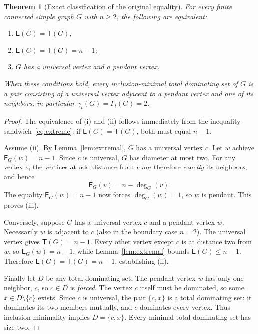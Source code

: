 \documentclass[11pt,a4paper]{article}
\newtheorem{theorem}{Theorem}[section]
\theoremstyle{definition}\newtheorem{definition}[theorem]{Definition}
\theoremstyle{remark}\newtheorem{remark}[theorem]{Remark}
\newcommand{\epar}{\mathsf E}
\newcommand{\trans}{\mathsf T}
\begin{document}
\begin{theorem}[Exact classification of the original equality]\label{thm:rigidity}
For every finite connected simple graph $G$ with $n\ge2$, the following are equivalent:
\begin{enumerate}[label=\textup{(\roman*)},itemsep=2pt]
\item $\epar(G)=\trans(G)$;
\item $\epar(G)=\trans(G)=n-1$;
\item $G$ has a universal vertex and a pendant vertex.
\end{enumerate}
When these conditions hold, every inclusion-minimal total dominating set of $G$ is a pair consisting of a universal vertex adjacent to a pendant vertex and one of its neighbors; in particular $\gamma_t(G)=\Gamma_t(G)=2$.
\end{theorem}
\begin{proof}
The equivalence of (i) and (ii) follows immediately from the inequality sandwich~\eqref{eq:extreme}: if $\epar(G)=\trans(G)$, both must equal $n-1$.

Assume (ii). By Lemma~\ref{lem:extremal}, $G$ has a universal vertex $c$. Let $w$ achieve $\epar_G(w)=n-1$. Since $c$ is universal, $G$ has diameter at most two. For any vertex $v$, the vertices at odd distance from $v$ are therefore \emph{exactly} its neighbors, and hence
\begin{equation}\label{eq:diam2}
\epar_G(v)=n-\deg_G(v).
\end{equation}
The equality $\epar_G(w)=n-1$ now forces $\deg_G(w)=1$, so $w$ is pendant. This proves (iii).

Conversely, suppose $G$ has a universal vertex $c$ and a pendant vertex $w$. Necessarily $w$ is adjacent to $c$ (also in the boundary case $n=2$). The universal vertex gives $\trans(G)=n-1$. Every other vertex except $c$ is at distance two from $w$, so $\epar_G(w)=n-1$, while Lemma~\ref{lem:extremal} bounds $\epar(G)\le n-1$. Therefore $\epar(G)=\trans(G)=n-1$, establishing (ii).

Finally let $D$ be any total dominating set. The pendant vertex $w$ has only one neighbor, $c$, so $c\in D$ is \emph{forced}. The vertex $c$ itself must be dominated, so some $x\in D\setminus\{c\}$ exists. Since $c$ is universal, the pair $\{c,x\}$ is a total dominating set: it dominates its two members mutually, and $c$ dominates every vertex. Thus inclusion-minimality implies $D=\{c,x\}$. Every minimal total dominating set has size two.
\end{proof}
\end{document}
